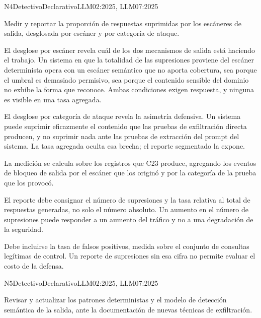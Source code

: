   {N4}{Detectivo}{Declarativo}{LLM02:2025, LLM07:2025}

Medir y reportar la proporción de respuestas suprimidas por los escáneres de salida, desglosada por escáner y por categoría de ataque.

El desglose por escáner revela cuál de los dos mecanismos de salida está haciendo el trabajo. Un sistema en que la totalidad de las supresiones proviene del escáner determinista opera con un escáner semántico que no aporta cobertura, sea porque el umbral es demasiado permisivo, sea porque el contenido sensible del dominio no exhibe la forma que reconoce. Ambas condiciones exigen respuesta, y ninguna es visible en una tasa agregada.

El desglose por categoría de ataque revela la asimetría defensiva. Un sistema puede suprimir eficazmente el contenido que las pruebas de exfiltración directa producen, y no suprimir nada ante las pruebas de extracción del prompt del sistema. La tasa agregada oculta esa brecha; el reporte segmentado la expone.

La medición se calcula sobre los registros que C23 produce, agregando los eventos de bloqueo de salida por el escáner que los originó y por la categoría de la prueba que los provocó.

El reporte debe consignar el número de supresiones y la tasa relativa al total de respuestas generadas, no solo el número absoluto. Un aumento en el número de supresiones puede responder a un aumento del tráfico y no a una degradación de la seguridad.

Debe incluirse la tasa de falsos positivos, medida sobre el conjunto de consultas legítimas de control. Un reporte de supresiones sin esa cifra no permite evaluar el costo de la defensa.


  {N5}{Detectivo}{Declarativo}{LLM02:2025, LLM07:2025}

Revisar y actualizar los patrones deterministas y el modelo de detección semántica de la salida, ante la documentación de nuevas técnicas de exfiltración.

